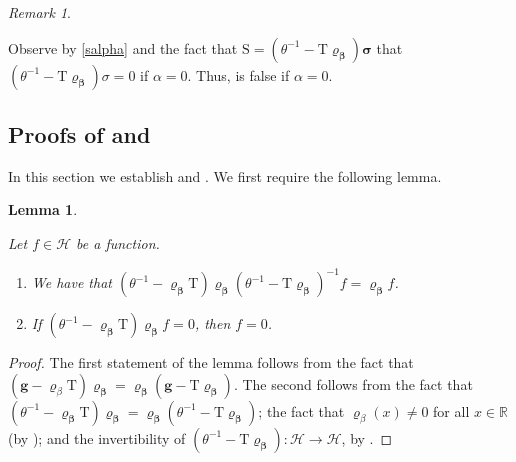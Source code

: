 \documentclass{amsart}
\numberwithin{equation}{section}
\newtheorem{lem}[thm]{Lemma}
\theoremstyle{remark}
\newtheorem{rem}[thm]{Remark}
\theoremstyle{definition}
\begin{document}
	\begin{rem} 
		
		\label{sigmaalpha0} 
		
		Observe by \eqref{salpha} and the fact that $\bm{\mathrm{S}} = (\theta^{-1} - \bm{\mathrm{T} \varrho_{\beta}}) \bm{\sigma}$ that $(\theta^{-1} - \bm{\mathrm{T} \varrho_{\beta}}) \sigma = 0$ if $\alpha = 0$. Thus,  is false if $\alpha = 0$.
		
	\end{rem} 
	
	
	\subsection{Proofs of  and }
	
	\label{Proofrho} 
	
	In this section we establish  and . We first require the following lemma.
	
	
	
	
	\begin{lem} 
		
		\label{hbetarhof} 
		
		Let $f \in \mathcal{H}$ be a function.
		
		\begin{enumerate} 
			
			\item We have that $(\theta^{-1} - \bm{\varrho_{\beta}} \bm{\mathrm{T}}) \bm{\varrho_{\beta}} (\theta^{-1}  - \bm{\mathrm{T}} \bm{\varrho_{\beta}})^{-1} f = \bm{\varrho_{\beta}} f$. 
			\item  If $(\theta^{-1} - \bm{\varrho_{\beta}} \bm{\mathrm{T}}) \bm{\varrho_{\beta}} f = 0$, then $f = 0$. 
			
		\end{enumerate} 
		
	\end{lem} 
	
	\begin{proof} 
		The first statement of the lemma follows from the fact that $(\bm{g} - \bm{\varrho}_{\beta} \bm{\mathrm{T}}) \bm{\varrho_{\beta}} = \bm{\varrho_{\beta}} (\bm{g} - \bm{\mathrm{T}} \bm{\varrho_{\beta}})$. The second follows from the fact that $(\theta^{-1} - \bm{\varrho_{\beta} \mathrm{T}}) \bm{\varrho_{\beta}} = \bm{\varrho_{\beta}} (\theta^{-1} - \bm{\mathrm{T} \varrho_{\beta}})$; the fact that $\varrho_{\beta} (x) \ne 0$ for all $x \in \mathbb{R}$ (by ); and the invertibility of $(\theta^{-1} - \bm{\mathrm{T} \varrho_{\beta}}): \mathcal{H} \rightarrow \mathcal{H}$, by .
	\end{proof}
	
\end{document}
